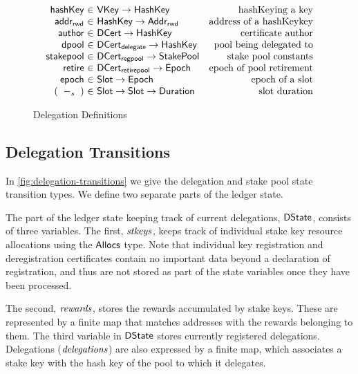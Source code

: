 \begin{figure}
\begin{equation*}
  \begin{array}{r@{~\in~}lr}
  \fun{hashKey} & \VKey \to \HashKey
  & \text{hashKeying a key}
  \\
  \fun{addr_{rwd}} & \HashKey \to \AddrRWD
  & \text{address of a hashKeykey}
  \\
  \fun{author} & \DCert \to \HashKey
  & \text{certificate author}
  \\
  \fun{dpool} & \DCertDeleg \to \HashKey
  & \text{pool being delegated to}
  \\
  \fun{stakepool} & \DCertRegPool \to \StakePool
  & \text{stake pool constants}
  \\
  \fun{retire} & \DCertRetirePool \to \Epoch
  & \text{epoch of pool retirement}
  \\
  \fun{epoch} & \Slot \to \Epoch
  & \text{epoch of a slot}
  \\
    (\slotminus{}{}) & \Slot \to \Slot \to \Duration
  & \text{slot duration}
  \end{array}
  \end{equation*}

  \caption{Delegation Definitions}
  \label{fig:delegation-definitons}
\end{figure}


\subsection{Delegation Transitions}
\label{sec:deleg-trans}


In \cref{fig:delegation-transitions} we give the delegation and stake pool
state transition types. We define two separate parts of the ledger state.

The part of the ledger state keeping track of current delegations, $\mathsf{DState}$,
consists of three variables. The first, $\mathit{stkeys}$, keeps track of individual
stake key resource allocations using the $\mathsf{Allocs}$ type.
Note that individual key registration
and deregistration certificates contain no important data beyond a declaration
of registration, and thus are not stored as part of the state variables once
they have been processed.

The second, $\mathit{rewards}$, stores the
rewards accumulated by stake keys. These are represented by
a finite
map that matches addresses with the rewards belonging to them. The third
variable in $\mathsf{DState}$ stores currently registered delegations.
Delegations ($\mathit{delegations}$) are also expressed by a finite map, which
associates a stake key with the hash key of the pool to which it delegates.

